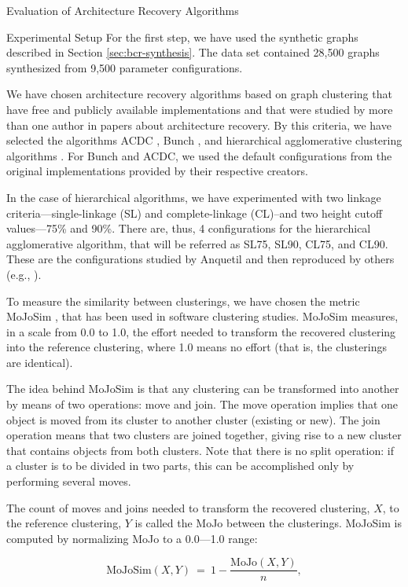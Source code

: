 \documentclass[11pt,twocolumn,a4paper,english]{article}
\begin{document}
\begin{section}{Evaluation of Architecture Recovery Algorithms}
\begin{subsection}{Experimental Setup}
	For the first step, we have used the synthetic graphs described in Section \ref{sec:bcr-synthesis}. The data set contained 28,500 graphs synthesized from 9,500 parameter configurations.
	
	We have chosen architecture recovery algorithms based on graph clustering that have free and publicly available implementations and that were studied by more than one author in papers about architecture recovery. By this criteria, we have selected the algorithms ACDC \cite{Tzerpos2000}, Bunch \cite{Mancoridis1998}, and hierarchical agglomerative clustering algorithms \cite{Anquetil1999}. For Bunch and ACDC, we used the default configurations from the original implementations provided by their respective creators.
		
	In the case of hierarchical algorithms, we have experimented with two linkage criteria---single-linkage (SL) and complete-linkage (CL)--and two height cutoff values---75\% and 90\%. There are, thus, 4 configurations for the hierarchical agglomerative algorithm, that will be referred as SL75, SL90, CL75, and CL90. These are the configurations studied by Anquetil  \cite{Anquetil1999,Anquetil2003} and then reproduced by others (e.g., \cite{Wu2005}).
	
	To measure the similarity between clusterings, we have chosen the metric MoJoSim \cite{Bittencourt2009}, that has been used in software clustering studies. MoJoSim measures, in a scale from 0.0 to 1.0, the effort needed to transform the recovered clustering into the reference clustering, where 1.0 means no effort (that is, the clusterings are identical).
	
	The idea behind MoJoSim is that any clustering can be transformed into another by means of two operations: move and join. The move operation implies that one object is moved from its cluster to another cluster (existing or new). The join operation means that two clusters are joined together, giving rise to a new cluster that contains objects from both clusters. Note that there is no split operation: if a cluster is to be divided in two parts, this can be accomplished only by performing several moves.
	
	The count of moves and joins needed to transform the recovered clustering, $X$, to the reference clustering, $Y$ is called the MoJo between the clusterings. MoJoSim is computed by normalizing MoJo to a 0.0---1.0 range:
	
	$$
	\mathrm{MoJoSim}(X, Y) ~=~ 1 - \frac{\mathrm{MoJo}(X, Y)}{n}\mathrm{,}
	$$
	

\end{subsection}
\end{section}
\end{document}
